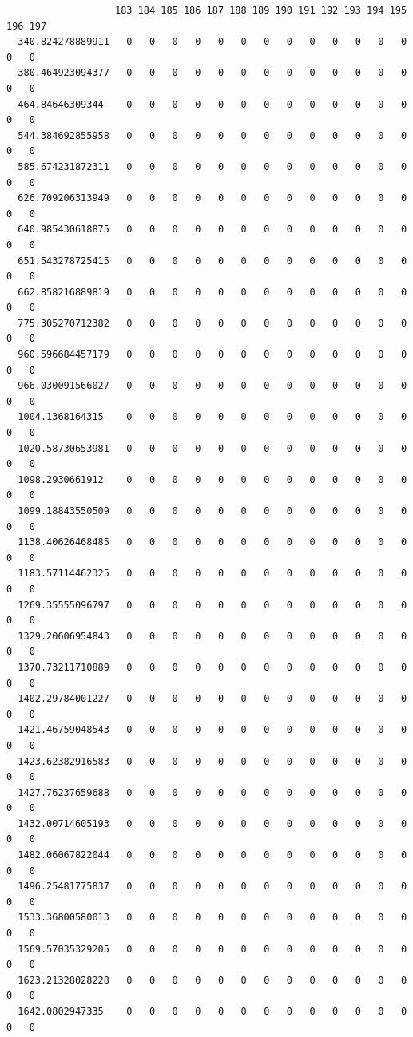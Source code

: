 \documentclass[
  letterpaper,
  DIV=11,
  numbers=noendperiod]{scrartcl}
\begin{document}
\begin{verbatim}
                   183 184 185 186 187 188 189 190 191 192 193 194 195 196 197
  340.824278889911   0   0   0   0   0   0   0   0   0   0   0   0   0   0   0
  380.464923094377   0   0   0   0   0   0   0   0   0   0   0   0   0   0   0
  464.84646309344    0   0   0   0   0   0   0   0   0   0   0   0   0   0   0
  544.384692855958   0   0   0   0   0   0   0   0   0   0   0   0   0   0   0
  585.674231872311   0   0   0   0   0   0   0   0   0   0   0   0   0   0   0
  626.709206313949   0   0   0   0   0   0   0   0   0   0   0   0   0   0   0
  640.985430618875   0   0   0   0   0   0   0   0   0   0   0   0   0   0   0
  651.543278725415   0   0   0   0   0   0   0   0   0   0   0   0   0   0   0
  662.858216889819   0   0   0   0   0   0   0   0   0   0   0   0   0   0   0
  775.305270712382   0   0   0   0   0   0   0   0   0   0   0   0   0   0   0
  960.596684457179   0   0   0   0   0   0   0   0   0   0   0   0   0   0   0
  966.030091566027   0   0   0   0   0   0   0   0   0   0   0   0   0   0   0
  1004.1368164315    0   0   0   0   0   0   0   0   0   0   0   0   0   0   0
  1020.58730653981   0   0   0   0   0   0   0   0   0   0   0   0   0   0   0
  1098.2930661912    0   0   0   0   0   0   0   0   0   0   0   0   0   0   0
  1099.18843550509   0   0   0   0   0   0   0   0   0   0   0   0   0   0   0
  1138.40626468485   0   0   0   0   0   0   0   0   0   0   0   0   0   0   0
  1183.57114462325   0   0   0   0   0   0   0   0   0   0   0   0   0   0   0
  1269.35555096797   0   0   0   0   0   0   0   0   0   0   0   0   0   0   0
  1329.20606954843   0   0   0   0   0   0   0   0   0   0   0   0   0   0   0
  1370.73211710889   0   0   0   0   0   0   0   0   0   0   0   0   0   0   0
  1402.29784001227   0   0   0   0   0   0   0   0   0   0   0   0   0   0   0
  1421.46759048543   0   0   0   0   0   0   0   0   0   0   0   0   0   0   0
  1423.62382916583   0   0   0   0   0   0   0   0   0   0   0   0   0   0   0
  1427.76237659688   0   0   0   0   0   0   0   0   0   0   0   0   0   0   0
  1432.00714605193   0   0   0   0   0   0   0   0   0   0   0   0   0   0   0
  1482.06067822044   0   0   0   0   0   0   0   0   0   0   0   0   0   0   0
  1496.25481775837   0   0   0   0   0   0   0   0   0   0   0   0   0   0   0
  1533.36800580013   0   0   0   0   0   0   0   0   0   0   0   0   0   0   0
  1569.57035329205   0   0   0   0   0   0   0   0   0   0   0   0   0   0   0
  1623.21328028228   0   0   0   0   0   0   0   0   0   0   0   0   0   0   0
  1642.0802947335    0   0   0   0   0   0   0   0   0   0   0   0   0   0   0

\end{verbatim}
\end{document}
